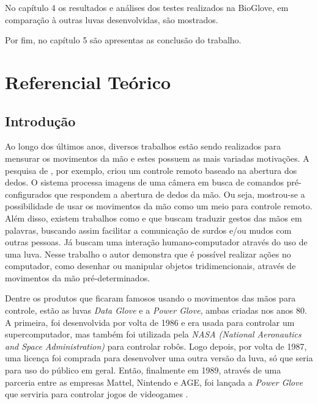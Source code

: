 \documentclass[
	12pt,				%
	openright,			%
	oneside,			%
	a4paper,			%
	english,			%
	brazil				%
	]{abntex2}
\begin{document}
		No capítulo 4 os resultados e análises dos testes realizados na BioGlove, em comparação à outras luvas desenvolvidas, são mostrados.

		Por fim, no capítulo 5 são apresentas as conclusão do trabalho.
		





	
	\chapter{Referencial Teórico}

		\section{Introdução}

		Ao longo dos últimos anos, diversos trabalhos estão sendo realizados para mensurar os movimentos da mão e estes possuem as mais variadas motivações. A pesquisa de \cite{daeholee2009vision}, por exemplo, criou um controle remoto baseado na abertura dos dedos. O sistema processa imagens de uma câmera em busca de comandos pré-configurados que respondem a abertura de dedos da mão. Ou seja, mostrou-se a possibilidade de usar os movimentos da mão como um meio para controle remoto. Além disso, existem trabalhos como \cite{solanki2013sign} e \cite{anbarasi2013deafmute} que buscam traduzir gestos das mãos em palavras, buscando assim facilitar a comunicação de surdos e/ou mudos com outras pessoas. Já \cite{kumar2012hci} buscam uma interação humano-computador através do uso de uma luva. Nesse trabalho o autor demonstra que é possível realizar ações no computador, como desenhar ou manipular objetos tridimencionais, através de movimentos da mão pré-determinados.

		Dentre os produtos que ficaram famosos usando o movimentos das mãos para controle, estão as luvas \textit{Data Glove} e a \textit{Power Glove}, ambas criadas nos anos 80. A primeira, foi desenvolvida por volta de 1986 e era usada para controlar um supercomputador, mas também foi utilizada pela \textit{NASA (National Aeronautics and Space Administration)} para controlar robôs. Logo depois, por volta de 1987, uma licença foi comprada para desenvolver uma outra versão da luva, só que seria para uso do público em geral. Então, finalmente em 1989, através de uma parceria entre as empresas Mattel, Nintendo e AGE, foi lançada a \textit{Power Glove} que serviria para controlar jogos de videogames \cite{dana1989powerglove}.
\end{document}
